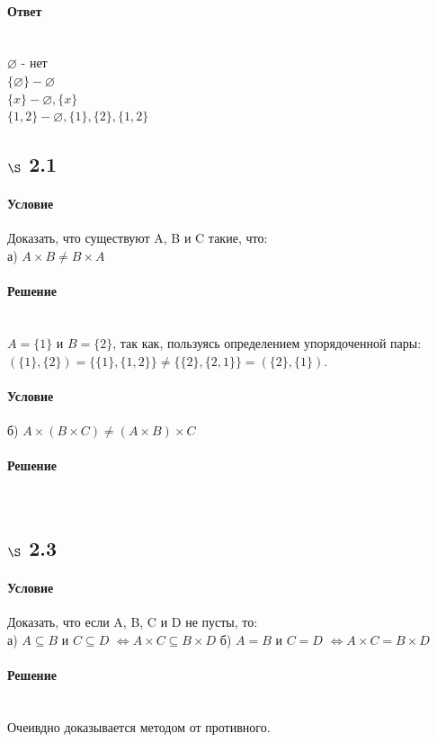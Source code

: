\documentclass[a4paper,12pt]{article}
\begin{document}
\paragraph*{Ответ} \mbox{}\\
$\varnothing $ - нет\\
$\{ \varnothing \} - \varnothing$\\
$\{ x \} - \varnothing, \{x\}$\\
$\{1, 2\} - \varnothing, \{1\}, \{2\}, \{1, 2\}$

\subsection*{$\S$ 2.1}
\paragraph*{Условие}
Доказать, что существуют A, B и C такие, что:\\
а) $A \times B \neq B \times A$
\paragraph*{Решение} \mbox{}\\
$A = \{1\}$ и $B = \{2\}$, так как, пользуясь определением упорядоченной пары: $ (\{1\},\{2\}) = \{\{1\},\{1,2\}\} \ne \{\{2\},\{2,1\}\} = (\{2\},\{1\})$.
\paragraph*{Условие}
б) $A \times (B \times C) \neq (A \times B) \times C$
\paragraph*{Решение} \mbox{}\\

\subsection*{$\S$ 2.3}
\paragraph*{Условие}
Доказать, что если A, B, C и D не пусты, то:\\
а) $A \subseteq B$ и $ C \subseteq D $ $\Leftrightarrow A \times C \subseteq B \times D$
б) $A = B$ и $ C = D $ $\Leftrightarrow A \times C = B \times D$
\paragraph*{Решение} \mbox{}\\
Очеивдно доказывается методом от противного.
\end{document}
